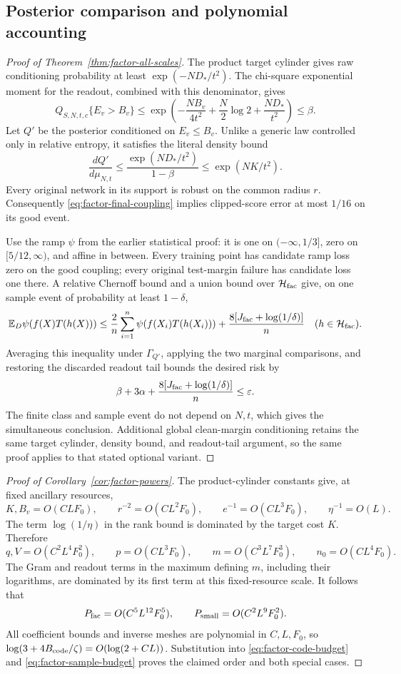\subsection{Posterior comparison and polynomial accounting}

\begin{proof}[Proof of Theorem~\ref{thm:factor-all-scales}]
The product target cylinder gives raw conditioning probability at least
$\exp(-ND_*/t^2)$. The chi-square exponential moment for the readout,
combined with this denominator, gives
\[
 Q_{S,N,t,c}\{E_v>B_v\}
 \le\exp\left(-\frac{NB_v}{4t^2}
                  +\frac N2\log2+\frac{ND_*}{t^2}\right)
 \le\beta.
\]
Let $Q'$ be the posterior conditioned on $E_v\le B_v$. Unlike a generic
law controlled only in relative entropy, it satisfies the literal
density bound
\[
 \frac{dQ'}{d\mu_{N,t}}
 \le\frac{\exp(ND_*/t^2)}{1-\beta}
 \le\exp(NK/t^2).
\]
Every original network in its support is robust on the common radius $r$.
Consequently \eqref{eq:factor-final-coupling} implies clipped-score error
at most $1/16$ on its good event.

Use the ramp $\psi$ from the earlier statistical proof: it is one on
$(-\infty,1/3]$, zero on $[5/12,\infty)$, and affine in between.
Every training point has candidate ramp loss zero on the good coupling;
every original test-margin failure has candidate loss one there.
A relative Chernoff bound and a union bound over
$\mathcal H_{\rm fac}$ give, on one sample event of probability at least
$1-\delta$,
\[
 \mathbb E_D\psi(f(X)T(h(X)))
 \le\frac2n\sum_{i=1}^n\psi(f(X_i)T(h(X_i)))
       +\frac{8[J_{\rm fac}+\log(1/\delta)]}{n}
 \quad(h\in\mathcal H_{\rm fac}).
\]
Averaging this inequality under $\Gamma_{Q'}$, applying the two marginal
comparisons, and restoring the discarded readout tail bounds the desired
risk by
\[
 \beta+3\alpha+
       \frac{8[J_{\rm fac}+\log(1/\delta)]}{n}\le\varepsilon.
\]
The finite class and sample event do not depend on $N,t$, which gives the
simultaneous conclusion. Additional global clean-margin conditioning retains
the same target cylinder, density bound, and readout-tail argument, so the
same proof applies to that stated optional variant.
\end{proof}

\begin{proof}[Proof of Corollary~\ref{cor:factor-powers}]
The product-cylinder constants give, at fixed ancillary resources,
\[
 K,B_v=O(CLF_0),\qquad r^{-2}=O(CL^2F_0),\qquad
 e^{-1}=O(CL^3F_0),\qquad \eta^{-1}=O(L).
\]
The term $\log(1/\eta)$ in the rank bound is dominated by the target cost
$K$. Therefore
\[
 q,V=O(C^2L^4F_0^2),\qquad p=O(CL^3F_0),\qquad
 m=O(C^3L^7F_0^3),\qquad n_0=O(CL^4F_0).
\]
The Gram and readout terms in the maximum defining $m$, including their
logarithms, are dominated by its first term at this fixed-resource scale.
It follows that
\[
 P_{\rm fac}=O(C^5L^{12}F_0^5),\qquad
 P_{\rm small}=O(C^2L^9F_0^2).
\]
All coefficient bounds and inverse meshes are polynomial in $C,L,F_0$,
so $\log(3+4B_{\rm code}/\zeta)=O(\log(2+CL))$.
Substitution into \eqref{eq:factor-code-budget} and
\eqref{eq:factor-sample-budget} proves the claimed order and both special
cases.
\end{proof}

